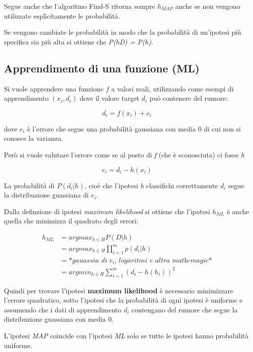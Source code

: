 Segue anche che l'algoritmo Find-S ritorna sempre $h_{MAP}$ anche se non vengono utilizzate esplicitamente le probabilità.

Se vengono cambiate le probabilità in modo che la probabilità di
un'ipotesi più specifica sia più alta si ottiene che
\emph{P(h\textbar{}D) = P(h)}.

\subsection{Apprendimento di una funzione (ML)}\label{apprendimento-di-una-funzione-ml}

Si vuole apprendere una funzione $f$ a valori reali, utilizzando come esempi di apprendimento $(x_i, d_i)$ dove il valore target $d_i$ può contenere del rumore:

$$
d_i = f(x_i) + e_i
$$

dove $e_i$ è l'errore che segue una probabilità gaussiana con media 0 di
cui non si conosce la varianza.

Però si vuole valutare l'errore come se al posto di \emph{f} (che è sconosciuta) ci fosse \emph{h}

$$
e_i = d_i - h(x_i)
$$

La probabilità di $P(d_i | h)$, cioè che l'ipotesi \emph{h}
classifichi correttamente $d_i$ segue la distribuzione guassiana di
$e_i$.

Dalla definzione di ipotesi \textit{maximum likelihood} si ottiene che l'ipotesi $h_{ML}$ è anche quella che minimizza il quadrato degli errori:

\begin{align*}
h_{ML} &= argmax_{h \in H} P(D|h) \\
				&=  argmax_{h \in H} \prod\limits_{i=1}^m p(d_i|h) \\
				&= *\textit{gauassia di } e_i \textit{, logaritmi e altra math-magic*}\\
				&= arg min_{h \in H} \sum\limits_{i = 1}^m (d_i - h(h_i))^2
\end{align*}

Quindi per trovare l'ipotesi \textbf{maximum likelihood} è necessario
minimizzare l'errore quadratico, sotto l'ipotesi che la probabilità di
ogni ipotesi è uniforme e assumendo che i dati di apprendimento $d_i$ contengano del rumore che segue la distribuzione guassiana con media 0.

L'ipotesi \textit{MAP} coincide con l'ipotesi \textit{ML} solo se tutte le ipotesi hanno probabilità uniforme.

